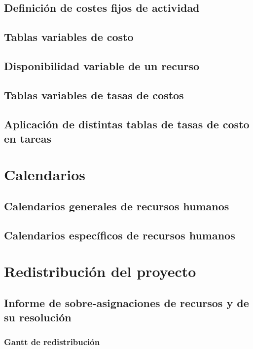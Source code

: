\documentclass[11pt,a4paper,spanish,twoside]{book}
\begin{document}
\section{Definición de costes fijos de actividad}

\section{Tablas variables de costo}

\section{Disponibilidad variable de un recurso}

\section{Tablas variables de tasas de costos}

\section{Aplicación de distintas tablas de tasas de costo en tareas}

\chapter{Calendarios}
\section{Calendarios generales de recursos humanos}

\section{Calendarios específicos de recursos humanos}

\chapter{Redistribución del proyecto}
\section{Informe de sobre-asignaciones de recursos y de su 
  resolución}
\subsection{Gantt de redistribución}
\end{document}
